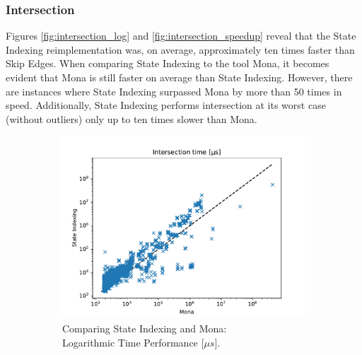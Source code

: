 \documentclass[pdflatex,sn-mathphys-num]{sn-jnl}%
\theoremstyle{thmstyleone}%
\theoremstyle{thmstyletwo}%
\theoremstyle{thmstylethree}%
\begin{document}
        \subsubsection*{Intersection}
            Figures \ref{fig:intersection_log} and \ref{fig:intersection_speedup} reveal that the State Indexing reimplementation was, on average, approximately ten times faster than Skip Edges. When comparing State Indexing to the tool Mona, it becomes evident that Mona is still faster on average than State Indexing. However, there are instances where State Indexing surpassed Mona by more than 50 times in speed. Additionally, State Indexing performs intersection at its worst case (without outliers) only up to ten times slower than Mona.
            \vspace*{-1em}
            \begin{figure}[h!]
                \centering
                \captionsetup[subfigure]{justification=centering}
                \begin{subfigure}{0.49\textwidth}
                    \includegraphics[width=\textwidth]{Figures/intersection-mona.pdf}
                    \caption*{Comparing State Indexing and Mona:\\ Logarithmic Time Performance [$\mu s$].}
                \end{subfigure}
                \begin{subfigure}{0.49\textwidth}

\end{subfigure}
\end{figure}
\end{document}
